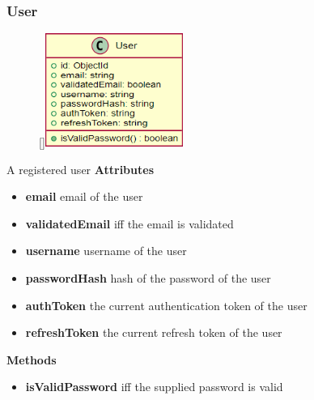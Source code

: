 \subsubsection{User}
\label{User}
\begin{figure}
    \raisebox{0pt}[\dimexpr{}\baselineskip\relax]{\includegraphics[width=4.5cm]{classes/auth/2.png}}
\end{figure} 
\par
A registered user
\newline
\newline
\textbf{Attributes}
\begin{itemize}
    \item \textbf{email} email of the user
    \item \textbf{validatedEmail} iff the email is validated
    \item \textbf{username} username of the user
    \item \textbf{passwordHash} hash of the password of the user
    \item \textbf{authToken} the current authentication token of the user
    \item \textbf{refreshToken} the current refresh token of the user
\end{itemize}
\textbf{Methods}
\begin{itemize}
    \item \textbf{isValidPassword} iff the supplied password is valid
\end{itemize}


